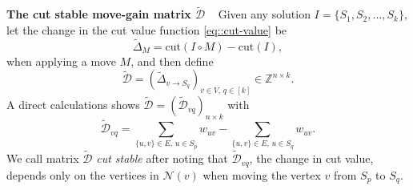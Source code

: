 \documentclass[12pt, a4paper]{article}%
\newcommand{\cut}{\mathrm{cut}}
\numberwithin{equation}{section}
\theoremstyle{plain}
\begin{document}
\textbf{The cut stable move-gain matrix $\tilde{\mathcal{D}}$} ~
Given any solution $I=\{S_1,S_2,\ldots,S_k\}$, let the change in the cut value function \eqref{eq::cut-value} be
\begin{equation}
	\widetilde{\Delta}_M=\cut(I\circ M)-\cut(I),
\end{equation} 
when applying a move $M$, and then define 
\begin{equation}
	\label{delta::dcut}
	\widetilde{\mathcal{D}}=(\widetilde{\Delta}_{v\rightarrow S_q})_{v\in V,\,q\in [k]}\in\mathbb{Z}^{n\times k}.
\end{equation} 
A direct calculations shows $\widetilde{\mathcal{D}} = (\widetilde{\mathcal{D}}_{vq})_{n\times k}$
with 
\begin{equation}
	\label{delta::value_cut}
	\widetilde{\mathcal{D}}_{vq}=\sum_{\{u,v\}\in E,\, u\in S_p}w_{uv}-\sum_{\{u,v\}\in E,\, u\in S_q}w_{uv}.
\end{equation} 
We call matrix $\tilde{\mathcal{D}}$ \emph{cut stable} after noting that $\widetilde{\mathcal{D}}_{vq}$, the change in cut value, depends only on the vertices in $\mathcal{N}(v)$ when moving the vertex $v$ from $S_p$ to $S_q$. 

\end{document}
